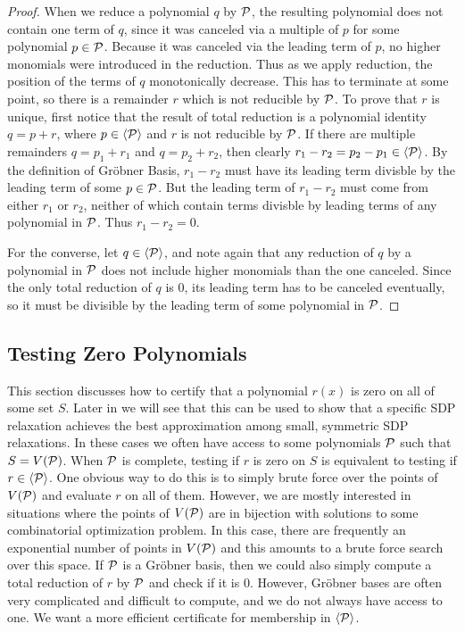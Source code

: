 \begin{proof}
When we reduce a polynomial $q$ by $\mathcal P$, the resulting polynomial does not contain one term of $q$, since it was canceled via a multiple of $p$ for some polynomial $p \in \mathcal P$. Because it was canceled via the leading term of $p$, no higher monomials were introduced in the reduction. Thus as we apply reduction, the position of the terms of $q$ monotonically decrease. This has to terminate at some point, so there is a remainder $r$ which is not reducible by $\mathcal P$. To prove that $r$ is unique, first notice that the result of total reduction is a polynomial identity $q = p + r$, where $p \in \langle \mathcal P \rangle$ and $r$ is not reducible by $\mathcal P$. If there are multiple remainders $q = p_1 + r_1$ and $q = p_2 + r_2$, then clearly $r_1 - r_2 = p_2 - p_1 \in \langle \mathcal P \rangle$. By the definition of Gr\"obner Basis, $r_1 - r_2$ must have its leading term divisble by the leading term of some $p \in \mathcal P$. But the leading term of $r_1 - r_2$ must come from either $r_1$ or $r_2$, neither of which contain terms divisble by leading terms of any polynomial in $\mathcal P$. Thus $r_1 - r_2 = 0$.

For the converse, let $q \in \langle \mathcal P \rangle$, and note again that any reduction of $q$ by a polynomial in $\mathcal P$ does not include higher monomials than the one canceled. Since the only total reduction of $q$ is $0$, its leading term has to be canceled eventually, so it must be divisible by the leading term of some polynomial in $\mathcal P$.
\end{proof}

\subsection{Testing Zero Polynomials}

This section discusses how to certify that a polynomial $r(x)$ is zero on all of some set $S$. Later in  we will see that this can be used to show that a specific SDP relaxation achieves the best approximation among small, symmetric SDP relaxations.
In these cases we often have access to some polynomials $\mathcal P$ such that $S = V(\mathcal P)$.
When $\mathcal P$ is complete, testing if $r$ is zero on $S$ is equivalent to testing if $r \in \langle \mathcal P \rangle$.
One obvious way to do this is to simply brute force over the points of $V(\mathcal P)$ and evaluate $r$ on all of them.
However, we are mostly interested in situations where the points of $V(\mathcal P)$ are in bijection with solutions to some combinatorial optimization problem.
In this case, there are frequently an exponential number of points in $V(\mathcal P)$ and this amounts to a brute force search over this space.
If $\mathcal P$ is a Gr\"obner basis, then we could also simply compute a total reduction of $r$ by $\mathcal P$ and check if it is $0$.
However, Gr\"obner bases are often very complicated and difficult to compute, and we do not always have access to one.
We want a more efficient certificate for membership in $\langle \mathcal P \rangle$.

